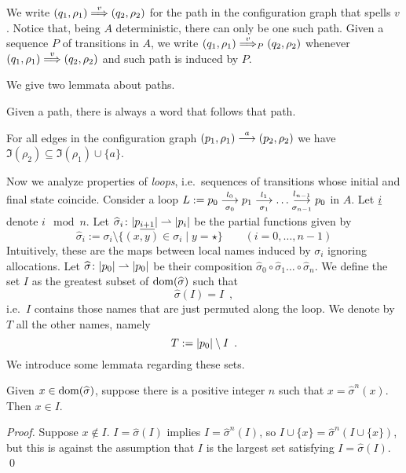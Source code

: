 
%
We write $(q_1,\rho_1) \overset{v}{\Longrightarrow} (q_2,\rho_2)$ for the path in the configuration graph that spells $v$. Notice that, being $A$ deterministic, there can only be one such path. Given a sequence $P$ of transitions in $A$, we write $(q_1,\rho_1) \overset{v}{\Longrightarrow}_{P} (q_2,\rho_2)$ whenever $(q_1,\rho_1) \overset{v}{\Longrightarrow} (q_2,\rho_2)$ and such path is induced by $P$.

We give two lemmata about paths.
\begin{lemma}
Given a path, there is always a word that follows that path.
\end{lemma}


\begin{lemma}
\label{lem:tr-names}
For all edges in the configuration graph $(p_1,\rho_1) \overset{a}{\longrightarrow} (p_2,\rho_2)$ we have $\Im(\rho_2) \subseteq \Im(\rho_1) \cup \{ a \}$.
\end{lemma}

Now we analyze properties of \emph{loops}, i.e.\ sequences of transitions whose initial and final state coincide. Consider a loop $L := p_0 \overset{l_0}{\underset{\sigma_0}{\longrightarrow}} p_1 \overset{l_1}{\underset{\sigma_1}{\longrightarrow}} \dots \overset{l_{n-1}}{\underset{\sigma_{n-1}}{\longrightarrow}} p_0$ in $A$. Let ${\underline{i}}$ denote $i \mod n$. Let $\widehat{\sigma}_i \colon |p_{\underline{i+1}}| \rightharpoonup |p_i|$ be the partial functions given by
\[
	\widehat{\sigma}_i := \sigma_i \setminus \{ (x,y) \in \sigma_i \mid y = \star \} 
	\qquad (i=0,\dots,n-1)
\]
Intuitively, these are the maps between local names induced by $\sigma_i$ ignoring allocations. Let $\widehat{\sigma} \colon |p_0| \rightharpoonup |p_0|$ be their composition $\widehat{\sigma}_0 \circ \widehat{\sigma}_1 \dots \circ \widehat{\sigma}_{n}$. We define the set $I$ as the greatest subset of $\operatorname{dom}(\widehat{\sigma})$ such that
\[
	\widehat{\sigma}(I) = I \enspace ,
\]
i.e.\ $I$ contains those names that are just permuted along the loop. We denote by $T$ all the other names, namely 
\[
	T := |p_0| \setminus I \enspace .
\]
%
We introduce some lemmata regarding these sets.

\begin{lemma}
\label{lem:xI}
Given $x \in \operatorname{dom}(\widehat{\sigma})$, suppose there is a positive integer $n$ such that $x = \widehat{\sigma}^n (x)$. Then $x \in I$.
\end{lemma}
\begin{proof}
Suppose $x \notin I$. $I = \widehat{\sigma}(I)$ implies $I = \widehat{\sigma}^n(I)$, so $I \cup \{x\} = \widehat{\sigma}^n(I \cup \{x\})$, but this is against the assumption that $I$ is the largest set satisfying $I = \widehat{\sigma}(I)$.
\qed
\end{proof}

